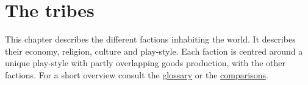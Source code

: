 \chapter{The tribes}\label{ch:Tribes}
This chapter describes the different factions inhabiting the world. It
describes their economy, religion, culture and play-style. Each faction is
centred around a unique play-style with partly overlapping goods production,
with the other factions. For a short overview consult the
\hyperref[ch:Tribes:Overview]{glossary} or the
\hyperref[ch:Tribes:Comparisons]{comparisons}.















\printglossary[type=tribe, title={Tribe-Glossary}]{}\label{ch:Tribes:Overview}
